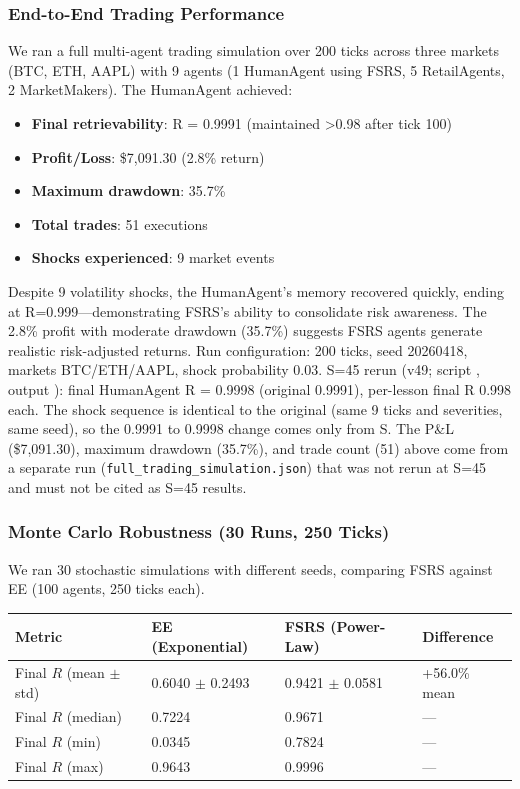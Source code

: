 \documentclass[11pt]{article}
\begin{document}
\subsubsection{End-to-End Trading Performance}
We ran a full multi-agent trading simulation over 200 ticks across three markets (BTC, ETH, AAPL) with 9 agents (1 HumanAgent using FSRS, 5 RetailAgents, 2 MarketMakers). The HumanAgent achieved:

\begin{itemize}
\item \textbf{Final retrievability}: R = 0.9991 (maintained >0.98 after tick 100)
\item \textbf{Profit/Loss}: \$7,091.30 (2.8\% return)
\item \textbf{Maximum drawdown}: 35.7\%
\item \textbf{Total trades}: 51 executions
\item \textbf{Shocks experienced}: 9 market events
\end{itemize}

Despite 9 volatility shocks, the HumanAgent's memory recovered quickly, ending at R=0.999---demonstrating FSRS's ability to consolidate risk awareness. The 2.8\% profit with moderate drawdown (35.7\%) suggests FSRS agents generate realistic risk-adjusted returns. Run configuration: 200 ticks, seed 20260418, markets BTC/ETH/AAPL, shock probability 0.03. S=45 rerun (v49; script , output ): final HumanAgent R = 0.9998 (original 0.9991), per-lesson final R 0.998 each. The shock sequence is identical to the original (same 9 ticks and severities, same seed), so the 0.9991 to 0.9998 change comes only from S. The P\&L (\$7,091.30), maximum drawdown (35.7\%), and trade count (51) above come from a separate run (\texttt{full\_trading\_simulation.json}) that was not rerun at S=45 and must not be cited as S=45 results.

\subsubsection{Monte Carlo Robustness (30 Runs, 250 Ticks)}
We ran 30 stochastic simulations with different seeds, comparing FSRS against EE (100 agents, 250 ticks each).

\begin{table}[htbp]
\centering
\begin{tabular}{llll}
\toprule
\textbf{Metric} & \textbf{EE (Exponential)} & \textbf{FSRS (Power-Law)} & \textbf{Difference} \\
\midrule
Final $R$ (mean $\pm$ std) & 0.6040 $\pm$ 0.2493 & 0.9421 $\pm$ 0.0581 & +56.0\% mean \\
Final $R$ (median) & 0.7224 & 0.9671 & --- \\
Final $R$ (min) & 0.0345 & 0.7824 & --- \\
Final $R$ (max) & 0.9643 & 0.9996 & --- \\
\bottomrule
\end{tabular}
\end{table}
\end{document}

